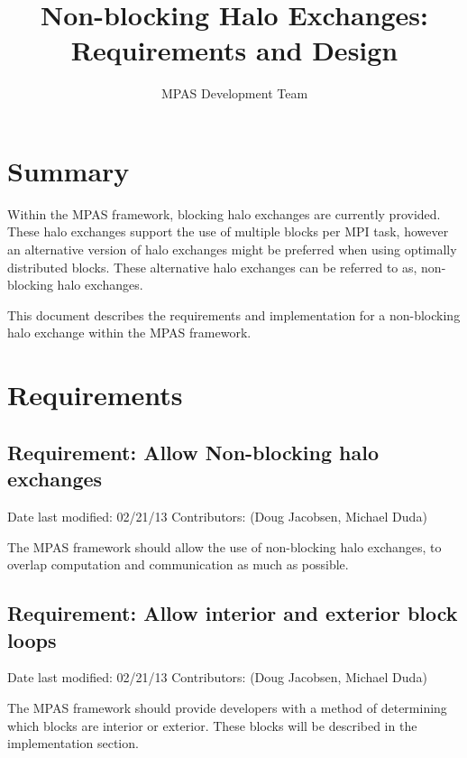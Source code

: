 \documentclass[11pt]{report}
\begin{document}
\title{Non-blocking Halo Exchanges: \\
Requirements and Design}
\author{MPAS Development Team}

\maketitle
\tableofcontents


\chapter{Summary}


Within the MPAS framework, blocking halo exchanges are currently provided.
These halo exchanges support the use of multiple blocks per MPI task, however
an alternative version of halo exchanges might be preferred when using
optimally distributed blocks. These alternative halo exchanges can be
referred to as, non-blocking halo exchanges. 

This document describes the requirements and implementation for a non-blocking
halo exchange within the MPAS framework.




\chapter{Requirements}

\section{Requirement: Allow Non-blocking halo exchanges}
Date last modified: 02/21/13
Contributors: (Doug Jacobsen, Michael Duda)

The MPAS framework should allow the use of non-blocking halo exchanges, to
overlap computation and communication as much as possible.

\section{Requirement: Allow interior and exterior block loops}
Date last modified: 02/21/13
Contributors: (Doug Jacobsen, Michael Duda)

The MPAS framework should provide developers with a method of determining which
blocks are interior or exterior. These blocks will be described in the
implementation section.
\end{document}
